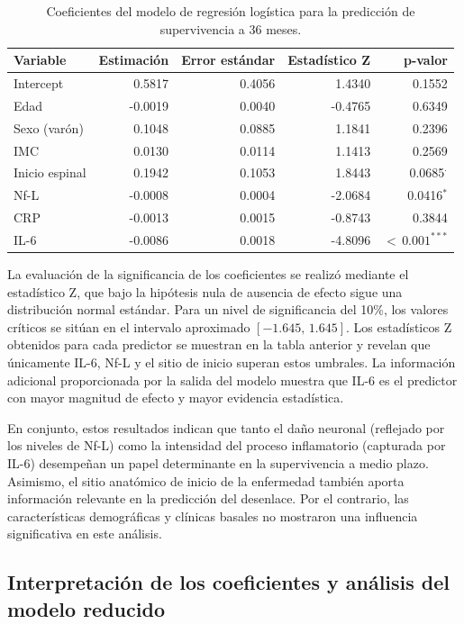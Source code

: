 \documentclass[12pt]{article} %
\begin{document}
\begin{table}[h!]
\centering
\caption{Coeficientes del modelo de regresión logística para la predicción de supervivencia a 36 meses.}
\label{tab:logit_coeff}
\begin{tabular}{lrrrr}
\hline
\textbf{Variable} & \textbf{Estimación} & \textbf{Error estándar} & \textbf{Estadístico Z} & \textbf{p-valor} \\
\hline
Intercept      &  0.5817 & 0.4056 &  1.4340 & 0.1552 \\
Edad           & -0.0019 & 0.0040 & -0.4765 & 0.6349 \\
Sexo (varón)   &  0.1048 & 0.0885 &  1.1841 & 0.2396 \\
IMC            &  0.0130 & 0.0114 &  1.1413 & 0.2569 \\
Inicio espinal &  0.1942 & 0.1053 &  1.8443 & 0.0685$^\cdot$ \\
Nf-L           & -0.0008 & 0.0004 & -2.0684 & 0.0416$^\ast$ \\
CRP            & -0.0013 & 0.0015 & -0.8743 & 0.3844 \\
IL-6           & -0.0086 & 0.0018 & -4.8096 & $<\,0.001^{\ast\ast\ast}$ \\
\hline
\end{tabular}
\end{table}

La evaluación de la significancia de los coeficientes se realizó mediante el estadístico Z, que bajo la hipótesis nula de ausencia de efecto sigue una distribución normal estándar. Para un nivel de significancia del 10\%, los valores críticos se sitúan en el intervalo aproximado $[-1.645,\, 1.645]$. Los estadísticos Z obtenidos para cada predictor se muestran en la tabla anterior y revelan que únicamente IL-6, Nf-L y el sitio de inicio superan estos umbrales. La información adicional proporcionada por la salida del modelo muestra que IL-6 es el predictor con mayor magnitud de efecto y mayor evidencia estadística.

En conjunto, estos resultados indican que tanto el daño neuronal (reflejado por los niveles de Nf-L) como la intensidad del proceso inflamatorio (capturada por IL-6) desempeñan un papel determinante en la supervivencia a medio plazo. Asimismo, el sitio anatómico de inicio de la enfermedad también aporta información relevante en la predicción del desenlace. Por el contrario, las características demográficas y clínicas basales no mostraron una influencia significativa en este análisis.

\subsection{Interpretación de los coeficientes y análisis del modelo reducido}
\end{document}
